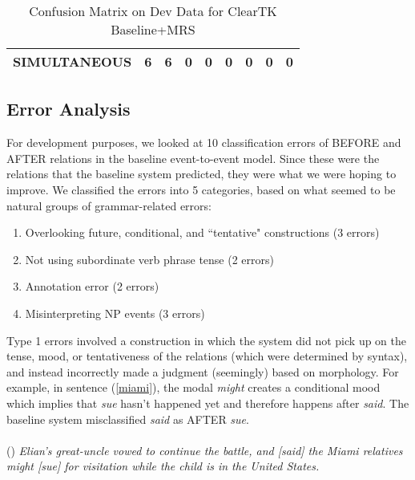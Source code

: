 \documentclass[11pt]{article}
\begin{document}
\begin{table*}[t]
{\begin{tabular}{l|c|c|c|c|c|c|c|c|}
\multicolumn{1}{|l|}{SIMULTANEOUS} & 6                          & 6                           & 0                              & 0                         & 0                             & 0                             & 0                                & 0                                 \\ \hline
\end{tabular}}
\caption{Confusion Matrix on Dev Data for ClearTK Baseline+MRS \label{matrix}}
\end{table*}


\subsection{Error Analysis}

For development purposes, we looked at 10 classification errors of BEFORE and AFTER relations in the baseline event-to-event model. Since these were the relations that the baseline system predicted, they were what we were hoping to improve. We classified the errors into 5 categories, based on what seemed to be natural groups of grammar-related errors:

\begin{enumerate}
\item Overlooking future, conditional, and ``tentative" constructions (3 errors)
\item Not using subordinate verb phrase tense (2 errors)
\item Annotation error (2 errors)
\item Misinterpreting NP events (3 errors)
\end{enumerate}

Type 1 errors involved a construction in which the system did not pick up on the tense, mood, or tentativeness of the relations (which were determined by syntax), and instead incorrectly made a judgment (seemingly) based on morphology. For example, in sentence (\ref{miami}), the modal \emph{might} creates a conditional mood which implies that \emph{sue} hasn't happened yet and therefore happens after \emph{said}. The baseline system misclassified \emph{said} as AFTER \emph{sue}.\\\\
(\exampleno) \label{miami} \emph{Elian's great-uncle vowed to continue the battle, and [said] the Miami relatives might [sue] for visitation while the child is in the United States.}\\\\
\end{document}
